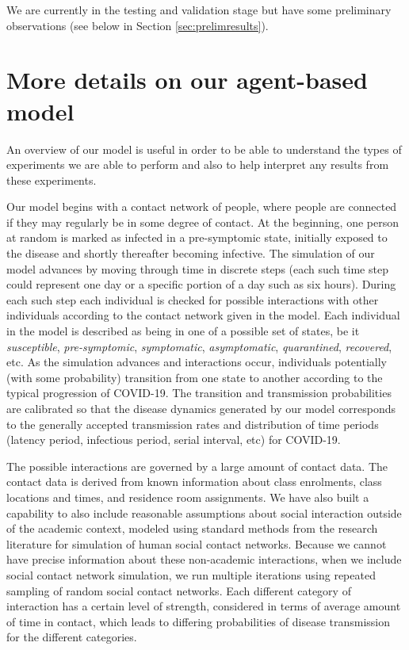\documentclass[fleqn,10pt]{SelfArx} %
\begin{document}
We are currently in the testing and validation stage but have some preliminary observations (see below in Section \ref{sec:prelimresults}).



\section{More details on our agent-based model}
An overview of our model is useful in order to be able to understand the types of experiments we are able to perform and also to help interpret any results from these experiments.

Our model begins with a contact network of people, where people are connected if they may regularly be in some degree of contact.  At the beginning, one person at random is marked as infected in a pre-symptomic state, initially exposed to the disease and shortly thereafter becoming infective.  
The simulation of our model advances by moving through time in discrete steps (each such time step could represent one day or a specific portion of a day such as six hours).
During each such step each individual is checked for possible interactions with other individuals according to the contact network given in the model.
Each individual in the model is described as being in one of a possible set of states, be it \emph{susceptible}, \emph{pre-symptomic}, \emph{symptomatic}, \emph{asymptomatic}, \emph{quarantined}, \emph{recovered}, etc.  As the simulation advances and interactions occur, individuals potentially (with some probability) transition from one state to another according to the typical progression of COVID-19.
The transition and transmission probabilities are calibrated so that the disease dynamics generated by our model corresponds to the generally accepted transmission rates and distribution of time periods (latency period, infectious period, serial interval, etc) for COVID-19.

The possible interactions are governed by a large amount of contact data.
The contact data is derived from known information about class enrolments, class locations and times, and residence room assignments.
We have also built a capability to also include reasonable assumptions about social interaction outside of the academic context, modeled using standard methods from the research literature for simulation of human social contact networks. Because we cannot have precise information about these non-academic interactions, when we include social contact network simulation, we run multiple iterations using repeated sampling of random social contact networks.
Each different category of interaction has a certain level of strength, considered in terms of average amount of time in contact, which leads to differing probabilities of disease transmission for the different categories.
\end{document}
